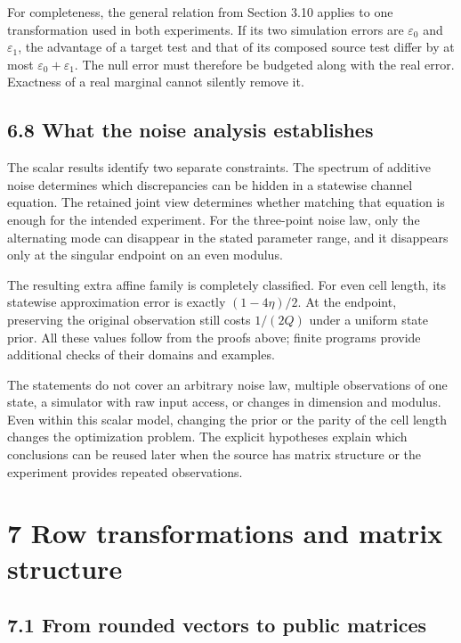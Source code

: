 \documentclass[
]{article}
\begin{document}
For completeness, the general relation from Section 3.10 applies to one
transformation used in both experiments. If its two simulation errors
are \(\varepsilon_0\) and \(\varepsilon_1\), the advantage of a target
test and that of its composed source test differ by at most
\(\varepsilon_0+\varepsilon_1\). The null error must therefore be
budgeted along with the real error. Exactness of a real marginal cannot
silently remove it.

\subsection{6.8 What the noise analysis
establishes}\label{what-the-noise-analysis-establishes}

The scalar results identify two separate constraints. The spectrum of
additive noise determines which discrepancies can be hidden in a
statewise channel equation. The retained joint view determines whether
matching that equation is enough for the intended experiment. For the
three-point noise law, only the alternating mode can disappear in the
stated parameter range, and it disappears only at the singular endpoint
on an even modulus.

The resulting extra affine family is completely classified. For even
cell length, its statewise approximation error is exactly
\((1-4\eta)/2\). At the endpoint, preserving the original observation
still costs \(1/(2Q)\) under a uniform state prior. All these values
follow from the proofs above; finite programs provide additional checks
of their domains and examples.

The statements do not cover an arbitrary noise law, multiple
observations of one state, a simulator with raw input access, or changes
in dimension and modulus. Even within this scalar model, changing the
prior or the parity of the cell length changes the optimization problem.
The explicit hypotheses explain which conclusions can be reused later
when the source has matrix structure or the experiment provides repeated
observations.

\section{7 Row transformations and matrix
structure}\label{row-transformations-and-matrix-structure}

\subsection{7.1 From rounded vectors to public
matrices}\label{from-rounded-vectors-to-public-matrices}
\end{document}

